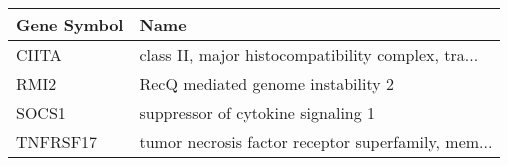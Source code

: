 \begin{tabular}{ll}
\toprule
Gene Symbol &                                               Name \\
\midrule
      CIITA & class II, major histocompatibility complex, tra... \\
       RMI2 &                 RecQ mediated genome instability 2 \\
      SOCS1 &                 suppressor of cytokine signaling 1 \\
   TNFRSF17 & tumor necrosis factor receptor superfamily, mem... \\
\bottomrule
\end{tabular}
